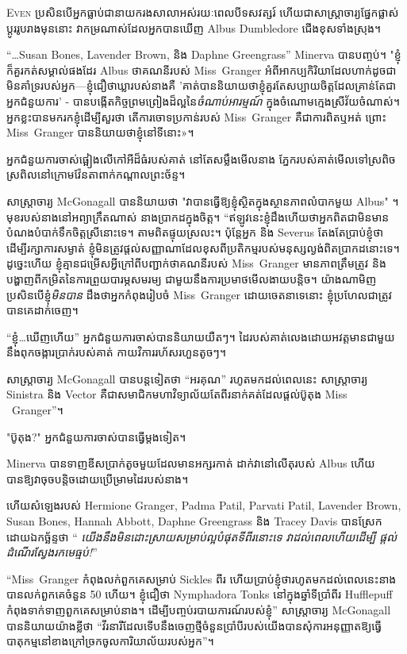 
\lettrine{E}{ven} ប្រសិនបើអ្នកធ្លាប់ជានាយករងសាលាអស់រយៈពេលបីទសវត្សរ៍ ហើយជាសាស្រ្តាចារ្យផ្នែកផ្លាស់ប្តូររូបរាងមុននោះ វាកម្រណាស់ដែលអ្នកបានឃើញ Albus Dumbledore ជើងខុសទាំងស្រុង។

“…Susan Bones, Lavender Brown, និង Daphne Greengrass” Minerva បានបញ្ចប់។ "ខ្ញុំក៏គួរកត់សម្គាល់ផងដែរ Albus ថាគណនីរបស់ Miss~Granger អំពីអាកប្បកិរិយាដែលហាក់ដូចជាមិនគាំទ្ររបស់អ្នក—ខ្ញុំជឿថាឃ្លារបស់នាងគឺ 'គាត់បាននិយាយថាខ្ញុំគួរតែសប្បាយចិត្តដែលគ្រាន់តែជាអ្នកជំនួយការ' - បានបង្កើតកិច្ចព្រមព្រៀងដ៏ល្អនៃ\emph{ចំណាប់អារម្មណ៍} ក្នុងចំណោមក្មេងស្រីវ័យចំណាស់។ អ្នក​ខ្លះ​បាន​មក​រក​ខ្ញុំ​ដើម្បី​សួរ​ថា តើ​ការ​ចោទ​ប្រកាន់​របស់ Miss~Granger គឺ​ជា​ការ​ពិត​ឬ​អត់ ព្រោះ Miss~Granger បាន​និយាយ​ថា​ខ្ញុំ​នៅ​ទីនោះ»។

អ្នកជំនួយការចាស់ផ្អៀងលើកៅអីដ៏ធំរបស់គាត់ នៅតែសម្លឹងមើលនាង ភ្នែករបស់គាត់មើលទៅស្រពិចស្រពិលនៅក្រោមវ៉ែនតាពាក់កណ្តាលព្រះច័ន្ទ។

សាស្រ្តាចារ្យ McGonagall បាននិយាយថា "វាបានធ្វើឱ្យខ្ញុំស្ថិតក្នុងស្ថានភាពលំបាកមួយ Albus" ។ មុខរបស់នាងនៅអព្យាក្រឹតណាស់ នាងប្រាកដក្នុងចិត្ត។ “ឥឡូវ​នេះ​ខ្ញុំ​ដឹង​ហើយ​ថា​អ្នក​ពិត​ជា​មិន​មាន​បំណង​បំបាក់​ទឹកចិត្ត​ស្រី​នោះ​ទេ។ តាមពិតផ្ទុយស្រលះ។ ប៉ុន្តែអ្នក និង Severus តែងតែប្រាប់ខ្ញុំថា ដើម្បីរក្សាការសម្ងាត់ ខ្ញុំមិនត្រូវផ្តល់សញ្ញាណាដែលខុសពីប្រតិកម្មរបស់មនុស្សល្ងង់ពិតប្រាកដនោះទេ។ ដូច្នេះហើយ ខ្ញុំគ្មានជម្រើសអ្វីក្រៅពីបញ្ជាក់ថាគណនីរបស់ Miss~Granger មានភាពត្រឹមត្រូវ និងបង្ហាញពីកម្រិតនៃការព្រួយបារម្ភសមរម្យ ជាមួយនឹងការប្រមាថមើលងាយបន្តិច។ យ៉ាងណាមិញ ប្រសិនបើខ្ញុំ\emph{មិនបាន} ដឹងថាអ្នកកំពុងរៀបចំ Miss~Granger ដោយចេតនាទេនោះ ខ្ញុំប្រហែលជាត្រូវបានគេដាក់ចេញ។

“ខ្ញុំ…ឃើញហើយ” អ្នកជំនួយការចាស់បាននិយាយយឺតៗ។ ដៃរបស់គាត់លេងដោយអវត្ដមានជាមួយនឹងពុកចង្ការប្រាក់របស់គាត់ កាយវិការរហ័សរហួនតូចៗ។

សាស្រ្តាចារ្យ McGonagall បានបន្តទៀតថា “អរគុណ” រហូតមកដល់ពេលនេះ សាស្ត្រាចារ្យ Sinistra និង Vector គឺជាសមាជិកមហាវិទ្យាល័យតែពីរនាក់គត់ដែលផ្តល់ប៊ូតុង Miss ~Granger”។

"ប៊ូតុង?" អ្នកជំនួយការចាស់បានធ្វើម្តងទៀត។

Minerva បានទាញឌីសប្រាក់តូចមួយដែលមានអក្សរកាត់ \SPHEW ដាក់វានៅលើតុរបស់ Albus ហើយបានឱ្យវាចុចបន្តិចដោយប្រើម្រាមដៃរបស់នាង។

ហើយសំឡេងរបស់ Hermione Granger, Padma Patil, Parvati Patil, Lavender Brown, Susan Bones, Hannah Abbott, Daphne Greengrass និង Tracey Davis បានស្រែកដោយឯកច្ឆ័ន្ទថា “\emph{ យើងនឹងមិនដោះស្រាយសម្រាប់ល្អបំផុតទីពីរនោះទេ វាដល់ពេលហើយដើម្បី ផ្តល់ដំណើរស្វែងរកមេធ្មប់!}”

“Miss~Granger កំពុងលក់ពួកគេសម្រាប់ Sickles ពីរ ហើយប្រាប់ខ្ញុំថារហូតមកដល់ពេលនេះនាងបានលក់ពួកគេចំនួន 50 ហើយ។ ខ្ញុំជឿថា Nymphadora Tonks នៅក្នុងឆ្នាំទីប្រាំពីរ Hufflepuff កំពុងទាក់ទាញពួកគេសម្រាប់នាង។ ដើម្បីបញ្ចប់របាយការណ៍របស់ខ្ញុំ” សាស្ត្រាចារ្យ McGonagall បាននិយាយយ៉ាងខ្លីថា “វីរនារីដែលទើបនឹងចេញថ្មីចំនួនប្រាំបីរបស់យើងបានសុំការអនុញ្ញាតឱ្យធ្វើបាតុកម្មនៅខាងក្រៅច្រកចូលការិយាល័យរបស់អ្នក”។

